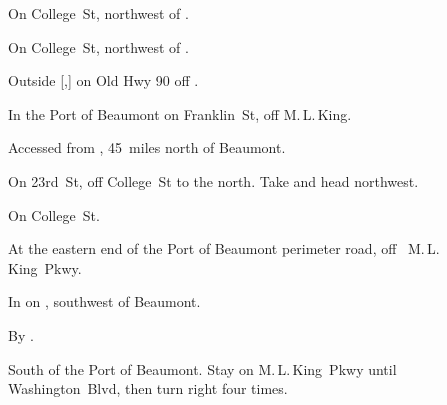 

\newcommand*{\MLKing}{M.\,L.\,King}

\begin{LocationList}

On  College~St, northwest of  .

On  College~St, northwest of  .

Outside [,] on Old Hwy 90 off  .

In the Port of Beaumont on Franklin~St, off  \MLKing.

Accessed from , 45~miles north of Beaumont.

On 23rd~St, off  College~St to the north.
Take   and head northwest.

\Location{\GarageHQ \Garage}
On  College~St.

At the eastern end of the Port of Beaumont perimeter road, off~ \MLKing~Pkwy.

\Location{\TruckService \Service}
In  on , southwest of Beaumont.

\Location{\TruckStop \Gas \Rest \Weigh}
By  .

South of the Port of Beaumont.
Stay on  \MLKing~Pkwy until Washington~Blvd, then turn right four times.

\end{LocationList}
